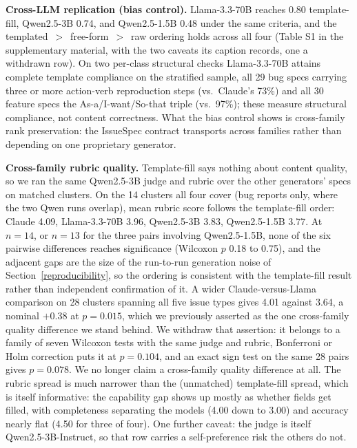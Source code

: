 \documentclass[11pt]{article}
\begin{document}
\textbf{Cross-LLM replication (bias control).} Llama-3.3-70B reaches 0.80 template-fill,
Qwen2.5-3B 0.74, and Qwen2.5-1.5B 0.48 under the same criteria, and the
templated~$>$~free-form~$>$~raw ordering holds across all four (Table S1 in the supplementary material, with
the two caveats its caption records, one a withdrawn row). On two per-class structural checks Llama-3.3-70B attains complete template compliance on the
stratified sample, all 29 bug specs carrying three or more action-verb reproduction steps (vs.\
Claude's 73\%) and all 30 feature specs the As-a/I-want/So-that triple (vs.\ 97\%); these measure
structural compliance, not content correctness. What the bias control shows is cross-family rank
preservation: the IssueSpec contract transports across families rather than depending on one
proprietary generator.

\textbf{Cross-family rubric quality.} Template-fill says nothing about content quality, so we ran
the same Qwen2.5-3B judge and rubric over the other generators' specs on matched clusters. On the
14 clusters all four cover (bug reports only, where the two Qwen runs overlap), mean rubric score
follows the template-fill order: Claude 4.09, Llama-3.3-70B 3.96, Qwen2.5-3B 3.83, Qwen2.5-1.5B
3.77. At $n=14$, or $n=13$ for the three pairs involving Qwen2.5-1.5B, none of the six pairwise
differences reaches significance (Wilcoxon $p$ 0.18 to 0.75), and the adjacent gaps are the size
of the run-to-run generation noise of Section~\ref{reproducibility}, so the ordering is consistent
with the template-fill result rather than independent confirmation of it. A wider
Claude-versus-Llama comparison on 28 clusters spanning all five issue types gives 4.01 against
3.64, a nominal $+0.38$ at $p = 0.015$, which we previously asserted as the one cross-family
quality difference we stand behind. We withdraw that assertion: it belongs to a family of seven
Wilcoxon tests with the same judge and rubric, Bonferroni or Holm correction puts it at $p =
0.104$, and an exact sign test on the same 28 pairs gives $p = 0.078$. We no longer claim a
cross-family quality difference at all. The rubric spread is much narrower than the (unmatched)
template-fill spread, which is itself informative: the capability gap shows up mostly as whether
fields get filled, with completeness separating the models (4.00 down to 3.00) and accuracy nearly
flat (4.50 for three of four). One further caveat: the judge is itself Qwen2.5-3B-Instruct, so
that row carries a self-preference risk the others do not.
\end{document}
